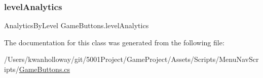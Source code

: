 \mbox{\label{class_game_buttons_a1d1a3181b45c9bd292fa2490acb742c2}} 
\subsubsection{\texorpdfstring{level\+Analytics}{levelAnalytics}}
{\footnotesize\ttfamily Analytics\+By\+Level Game\+Buttons.\+level\+Analytics}



The documentation for this class was generated from the following file\+:\begin{DoxyCompactItemize}
\item 
/\+Users/kwanholloway/git/5001\+Project/\+Game\+Project/\+Assets/\+Scripts/\+Menu\+Nav\+Scripts/\hyperlink{_game_buttons_8cs}{Game\+Buttons.\+cs}\end{DoxyCompactItemize}
